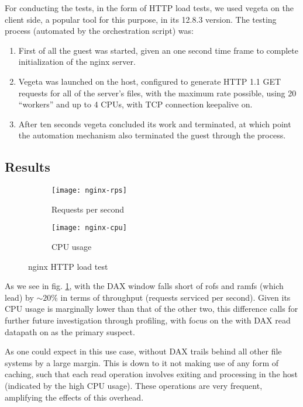 For conducting the tests, in the form of HTTP load tests, we used vegeta
\cite{vegeta} on the client side, a popular tool for this purpose, in its 12.8.3
version. The testing process (automated by the orchestration script) was:
\begin{enumerate}
    \item First of all the \osv{} guest was started, given an one second time
          frame to complete initialization of the nginx server.
    \item Vegeta was launched on the host, configured to generate HTTP 1.1 GET
          requests for all of the server's files, with the maximum rate
          possible, using 20 ``workers'' and up to 4 CPUs, with TCP connection
          keepalive on.
    \item After ten seconds vegeta concluded its work and terminated, at which
          point the automation mechanism also terminated the guest through the
          \qemu{} process.
\end{enumerate}

\subsection{Results}

\begin{figure}
    \begin{minipage}[c][\textheight]{\textwidth}
        \begin{subfigure}[c][0.5\textheight]{\textwidth}
            \caption{Requests per second}
            \texttt{[image: nginx-rps]}
            \label{fig:nginx-rps}
        \end{subfigure}
        \begin{subfigure}[c][0.5\textheight]{\textwidth}
            \caption{CPU usage}
            \texttt{[image: nginx-cpu]}
            \label{fig:nginx-cpu}
        \end{subfigure}
        \caption{nginx HTTP load test}
        \label{fig:nginx}
    \end{minipage}
\end{figure}


As we see in fig. \ref{fig:nginx-rps}, \viofs{} with the DAX window falls short
of rofs and ramfs (which lead) by \(\sim 20\%\) in terms of throughput (requests
serviced per second). Given its CPU usage is marginally lower than that of the
other two, this difference calls for further future investigation through
profiling, with focus on the \viofs{} with DAX read datapath on \osv{} as the
primary suspect.

As one could expect in this use case, \viofs{} without DAX trails behind all
other file systems by a large margin. This is down to it not making use of any
form of caching, such that each read operation involves exiting and processing
in the host (indicated by the high CPU usage). These operations are very
frequent, amplifying the effects of this overhead.
